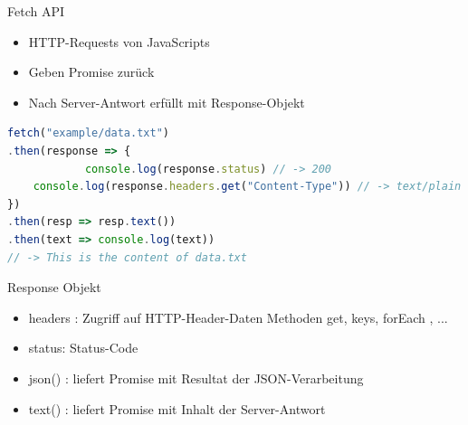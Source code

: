 \begin{definition}{Fetch API}
\begin{itemize}
  \item HTTP-Requests von JavaScripts
  \item Geben Promise zurück
  \item Nach Server-Antwort erfüllt mit Response-Objekt
\end{itemize}
\end{definition}
\begin{lstlisting}[language=JavaScript, style=basesmol]
fetch("example/data.txt")
.then(response => {
            console.log(response.status) // -> 200
    console.log(response.headers.get("Content-Type")) // -> text/plain
})
.then(resp => resp.text())
.then(text => console.log(text))
// -> This is the content of data.txt
\end{lstlisting}

Response Objekt

\begin{itemize}
  \item headers : Zugriff auf HTTP-Header-Daten Methoden get, keys, forEach , ...
  \item status: Status-Code
  \item json() : liefert Promise mit Resultat der JSON-Verarbeitung
  \item text() : liefert Promise mit Inhalt der Server-Antwort
\end{itemize}